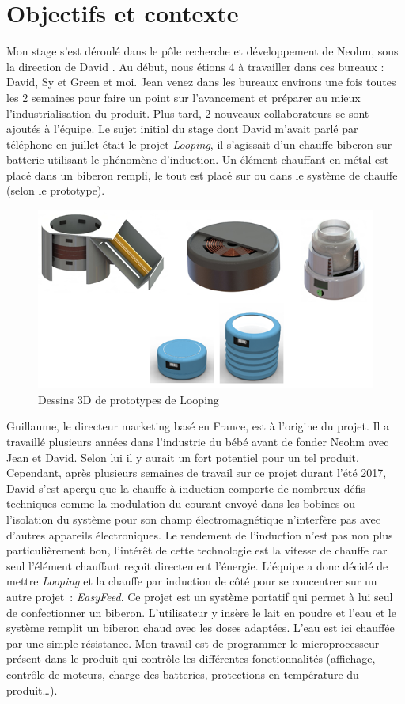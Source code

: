 \documentclass[a4paper, 12pt, sffamily]{report}
\begin{document}
\chapter{Objectifs et contexte}
Mon stage s’est déroulé dans le pôle recherche et développement de Neohm, sous la direction de David . Au début, nous étions 4 à travailler dans ces bureaux : David, Sy et Green et moi. Jean venez dans les bureaux environs une fois toutes les 2 semaines pour faire un point sur l'avancement et préparer au mieux l'industrialisation du produit. Plus tard, 2 nouveaux collaborateurs se sont ajoutés à l’équipe.
Le sujet initial du stage dont David m’avait parlé par téléphone en juillet était le projet \emph{Looping}, il s’agissait d’un chauffe biberon sur batterie utilisant le phénomène d’induction. Un élément chauffant en métal est placé dans un biberon rempli, le tout est placé sur ou dans le système de chauffe (selon le prototype).

\begin{figure}[H]
\centering
\includegraphics[scale=0.75]{figures/screenshots/3D_drawing_looping.png}
\caption{Dessins 3D de prototypes de Looping}
\label{fig:3D_looping}
\end{figure}

Guillaume, le directeur marketing basé en France, est à l’origine du projet. Il a travaillé plusieurs années dans l’industrie du bébé avant de fonder Neohm avec Jean et David. Selon lui il y aurait un fort potentiel pour un tel produit.
Cependant, après plusieurs semaines de travail sur ce projet durant l’été 2017, David s’est aperçu que la chauffe à induction comporte de nombreux défis techniques comme la modulation du courant envoyé dans les bobines ou l’isolation du système pour son champ électromagnétique n’interfère pas avec d’autres appareils électroniques. Le rendement de l’induction n’est pas non plus particulièrement bon, l’intérêt de cette technologie est la vitesse de chauffe car seul l’élément chauffant reçoit directement l’énergie.
L’équipe a donc décidé de mettre \emph{Looping} et la chauffe par induction de côté pour se concentrer sur un autre projet~: \emph{EasyFeed}. Ce projet est un système portatif qui permet à lui seul de confectionner un biberon. L’utilisateur y insère le lait en poudre et l’eau et le système remplit un biberon chaud avec les doses adaptées. L’eau est ici chauffée par une simple résistance.
Mon travail est de programmer le microprocesseur présent dans le produit qui contrôle les différentes fonctionnalités (affichage, contrôle de moteurs, charge des batteries, protections en température du produit…).
\end{document}
